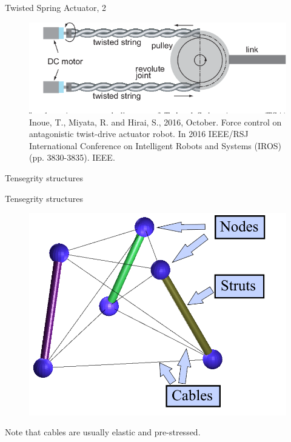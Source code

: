 \documentclass{beamer}
\begin{document}
\begin{frame}{Twisted Spring Actuator, 2}
	\begin{flushleft}
		
		\begin{figure}
			\centering
			\includegraphics[width=1\linewidth]{TSA_2}
			\caption{Inoue, T., Miyata, R. and Hirai, S., 2016, October. Force control on antagonistic twist-drive actuator robot. In 2016 IEEE/RSJ International Conference on Intelligent Robots and Systems (IROS) (pp. 3830-3835). IEEE.}
			\label{fig:tsa2}
		\end{figure}
		
		
		
	\end{flushleft}
\end{frame}



\begin{frame}
	\centerline{Tensegrity structures}
\end{frame}



\begin{frame}{Tensegrity structures}
	\begin{flushleft}
		
		\begin{figure}
			\centering
			\includegraphics[width=0.7\linewidth]{tensegrity_1}
			\label{fig:tensegrity1}
		\end{figure}
		
		Note that cables are usually elastic and pre-stressed.
		
	\end{flushleft}
\end{frame}
\end{document}
